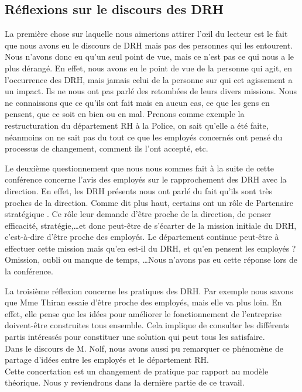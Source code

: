 \subsection{Réflexions sur le discours des DRH}

La première chose sur laquelle nous aimerions attirer l'œil du lecteur est le fait que nous avons eu le discours de DRH mais pas des personnes qui les entourent. Nous n'avons donc eu qu'un seul point de vue, mais ce n'est pas ce qui nous a le plus dérangé. En effet, nous avons eu le point de vue de la personne qui agit, en l'occurrence des DRH, mais jamais celui de la personne sur qui cet agissement a un impact. Ils ne nous ont pas parlé des retombées de leurs divers missions. Nous ne connaissons que ce qu'ils ont fait mais en aucun cas, ce que les gens en pensent, que ce soit en bien ou en mal. Prenons comme exemple la restructuration du département RH à la Police, on sait qu'elle a été faite, néanmoins on ne sait pas du tout ce que les employés concernés ont pensé du processus de changement, comment ils l'ont accepté, etc. \newline 

Le deuxième questionnement que nous nous sommes fait à la suite de cette conférence concerne l'avis des employés sur le rapprochement des DRH avec la direction. En effet, les DRH présents nous ont parlé du fait qu'ils sont très proches de la direction. Comme dit plus haut, certains ont un rôle de \og Partenaire stratégique \fg{}. Ce rôle leur demande d'être proche de la direction, de penser efficacité, stratégie,\ldots et donc peut-être de s'écarter de la mission initiale du DRH, c'est-à-dire d'être proche des employés.
 Le département continue peut-être à effectuer cette mission mais qu'en est-il du DRH, et qu'en pensent les employés ? Omission, oubli ou manque de temps, \ldots Nous n'avons pas eu cette réponse lors de la conférence. \newline

La troisième réflexion concerne les pratiques des DRH. Par exemple nous savons que Mme Thiran essaie d'être proche des employés, mais elle va plus loin. En effet, elle pense que les idées pour améliorer le fonctionnement de l'entreprise doivent-être construites tous ensemble. Cela implique de consulter les différents partis intéressés pour constituer une solution qui peut tous les satisfaire. \\
Dans le discours de M. Nolf, nous avons aussi pu remarquer ce phénomène de partage d'idées entre les employés et le département RH.\\
Cette concertation est un changement de pratique par rapport au modèle théorique. Nous y reviendrons dans la dernière partie de ce travail.\newline

